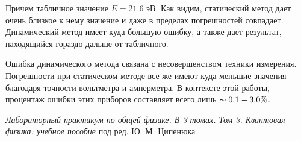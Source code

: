 \documentclass[12pt,a4paper]{article}
\begin{document}
 	Причем табличное значение $E = 21.6$ эВ. Как видим, статический метод дает очень близкое к нему значение и даже в пределах погрешностей совпадает. Динамический метод имеет куда большую ошибку, а также дает результат, находящийся гораздо дальше от табличного.
 	
 	Ошибка динамического метода связана с несовершенством техники измерения. Погрешности при статическом методе все же имеют куда меньшие значения благодаря точности вольтметра и амперметра. В контексте этой работы, процентаж ошибки этих приборов составляет всего лишь $\thicksim 0.1-3.0\%$.

    \vfill

    \begin{thebibliography}{9}
    	 \emph{Лабораторный практикум по общей физике. В 3 томах. Том 3. Квантовая физика: учебное пособие} под ред. Ю. М. Ципенюка
    \end{thebibliography}
\end{document}
